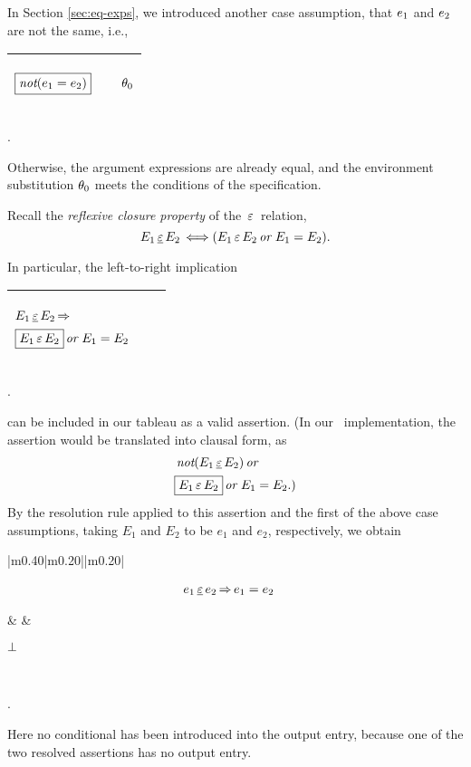 \documentclass[runningheads]{llncs}
\DeclareMathOperator{\uor}{\emph{or}\,}
\DeclareMathOperator{\unot}{\emph{not}\kern-.0pt}
\DeclareMathOperator{\uimplies}{\Rightarrow}
\DeclareMathOperator{\uiff}{\iff}
\begin{document}
In Section \ref{sec:eq-exps}, we introduced another case assumption, that $e_{1}$ and $e_{2}$ are not the same, i.e.,
\begin{center}
  \begin{tabular}{|m{}|m{}||m{}|}
\hline
\begin{center}
$\boxed{\unot(\e{1} = \e{2})}$
\end{center}& & \begin{center} $\theta_{0}$ \end{center} \\  \hline
\end{tabular}.
\end{center}
Otherwise, the argument expressions are already equal, and the environment substitution $\theta_{0}$ meets the conditions of the specification.

Recall the \emph{reflexive closure property} of the $\, \varepsilon \,$ relation,
\[E_1 \occurseq E_2 \uiff (E_1 \occursin E_2 \uor \E{1} = \E{2}). \]

In particular, the left-to-right implication 
\begin{center}
  \begin{tabular}{|m{}|m{}||m{}|}
\hline
\begin{center}
$
\begin{aligned}
&E_1 \occurseq E_2 \uimplies  \\
&\boxed{E_1 \occursin E_2} \uor \E{1} = \E{2} 
\end{aligned}
$
\end{center}& &  \\  \hline
\end{tabular}.
\end{center} 
can be included in our tableau as a valid assertion. (In our \SNARK\ implementation, the assertion would be translated into clausal form, as  
\[
\begin{aligned}[b]
&\unot(E_1 \occurseq E_2) \uor  \\
&\boxed{E_1 \occursin E_2} \uor \E{1} = \E{2}. 
\end{aligned})
\]
By the resolution rule applied to this assertion and the first of the above case assumptions, taking $E_1$ and $E_2$ to be $e_1$ and $e_2$, respectively, we obtain
\begin{center}
  \begin{tabular}{|m{}|m{}||m{}|}
\hline
\begin{center}
\[
\begin{aligned}
&e_1 \occurseq e_2 \uimplies 
e_{1} = e_2
\end{aligned}
\]
\end{center}& & 
\begin{center} $\bot$ \end{center}
\\  \hline
\end{tabular}.
\end{center} 
Here no conditional has been introduced into the output entry, because one of the two resolved assertions has no output entry.
\end{document}
